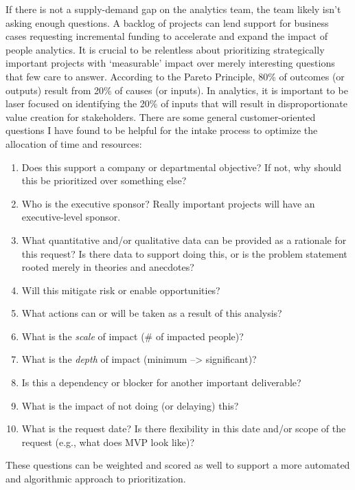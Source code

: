 \documentclass[]{book}
\providecommand{\tightlist}{%
  \setlength{\itemsep}{0pt}\setlength{\parskip}{0pt}}
\begin{document}
If there is not a supply-demand gap on the analytics team, the team likely isn't asking enough questions. A backlog of projects can lend support for business cases requesting incremental funding to accelerate and expand the impact of people analytics. It is crucial to be relentless about prioritizing strategically important projects with `measurable' impact over merely interesting questions that few care to answer. According to the Pareto Principle, 80\% of outcomes (or outputs) result from 20\% of causes (or inputs). In analytics, it is important to be laser focused on identifying the 20\% of inputs that will result in disproportionate value creation for stakeholders. There are some general customer-oriented questions I have found to be helpful for the intake process to optimize the allocation of time and resources:

\begin{enumerate}
\def\labelenumi{\arabic{enumi}.}
\tightlist
\item
  Does this support a company or departmental objective? If not, why should this be prioritized over something else?
\item
  Who is the executive sponsor? Really important projects will have an executive-level sponsor.
\item
  What quantitative and/or qualitative data can be provided as a rationale for this request? Is there data to support doing this, or is the problem statement rooted merely in theories and anecdotes?
\item
  Will this mitigate risk or enable opportunities?
\item
  What actions can or will be taken as a result of this analysis?
\item
  What is the \emph{scale} of impact (\# of impacted people)?
\item
  What is the \emph{depth} of impact (minimum --\textgreater{} significant)?
\item
  Is this a dependency or blocker for another important deliverable?
\item
  What is the impact of not doing (or delaying) this?
\item
  What is the request date? Is there flexibility in this date and/or scope of the request (e.g., what does MVP look like)?
\end{enumerate}

These questions can be weighted and scored as well to support a more automated and algorithmic approach to prioritization.
\end{document}
